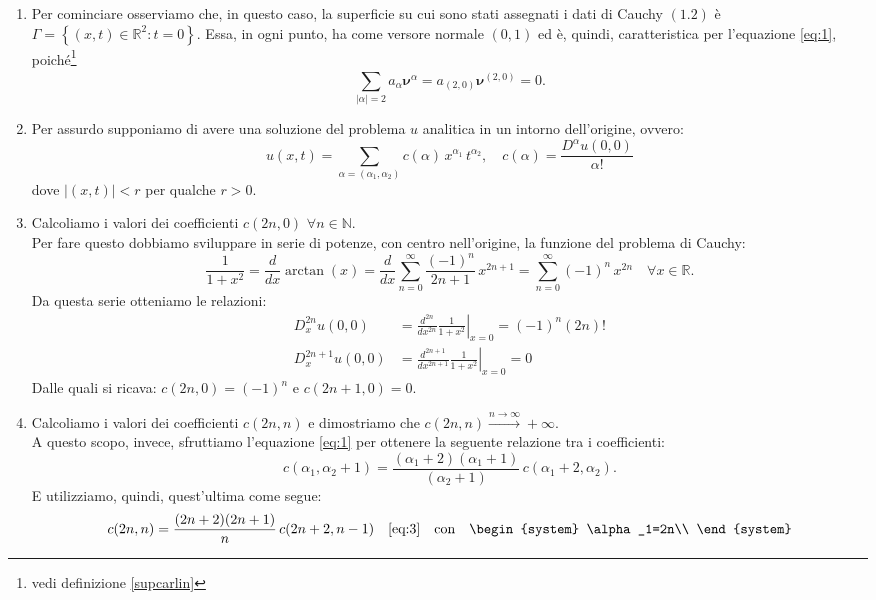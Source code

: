 \begin{enumerate}
\item
Per cominciare osserviamo che, in questo caso, la superficie su cui sono stati assegnati i dati di Cauchy $(1.2)$ è 
$\Gamma=\left\lbrace(x,t) \in \mathbb{R}^2:t=0\right\rbrace$. Essa, in ogni punto, ha come versore normale $(0,1)$ ed è, quindi,
caratteristica per l'equazione \eqref{eq:1}, poiché\footnote{vedi definizione \ref{supcarlin}}
$$\sum_{|\alpha|=2}^{\;} a_\alpha \boldsymbol{\nu}^\alpha = a_{(2,0)}\boldsymbol{\nu}^{(2,0)} = 0. $$
\item
Per assurdo supponiamo di avere una soluzione del problema $u$ analitica in un intorno dell'origine, ovvero:
$$u(x,t) = \sum_{\alpha = (\alpha_1, \alpha_2) }^{\;} c(\alpha) \, x^{\alpha_1} \, t ^{\alpha_2}, \quad
 c(\alpha) = \frac{D^\alpha u(0,0)}{\alpha!}$$
dove $|(x,t)|<r$ per qualche $r>0$.
\item
Calcoliamo i valori dei coefficienti $c(2n,0)$ $\forall n \in \mathbb{N}$.\\
Per fare questo dobbiamo sviluppare in serie di potenze, con centro nell'origine, la funzione del problema di Cauchy:
$$\frac{1}{1+x^2} = \frac{d}{dx}\arctan(x) = \frac{d}{dx}\sum_{n=0}^{\infty}\frac{(-1)^n}{2n+1} \, x^{2n+1} 
= \sum_{n=0}^{\infty}(-1)^n \, x^{2n} \quad \forall x \in \mathbb{R}.$$
Da questa serie otteniamo le relazioni:
\begin{align*}
D_x^{2n}u(0,0) &= \frac{d^{2n}}{dx^{2n}} \left. \frac{1}{1+x^2}\right|_{x=0} = (-1)^n (2n)!\\
D_x^{2n+1}u(0,0) &= \frac{d^{2n+1}}{dx^{2n+1}} \left. \frac{1}{1+x^2} \right|_{x=0} = 0
\end{align*} 
Dalle quali si ricava: $c(2n,0)=(-1)^n$ e $c(2n+1,0)=0$.
\item
Calcoliamo i valori dei coefficienti $c(2n,n)$ e dimostriamo che  $c(2n,n) \xrightarrow{n\rightarrow\infty} +\infty$.\\
A questo scopo, invece, sfruttiamo l'equazione \eqref{eq:1} per ottenere la seguente relazione tra i coefficienti:
\begin{equation} 
\label{eq:3}
c(\alpha_1,\alpha_2+1) = \frac{(\alpha_1+2)(\alpha_1+1)}{(\alpha_2+1)} \, c(\alpha_1+2,\alpha_2).
\end{equation}
E utilizziamo, quindi, quest'ultima come segue:
\begin{align*}
c(2n,n) &= \frac{(2n+2)(2n+1)}{n} \, c(2n+2,n-1)   &\eqref{eq:3}\quad\text{con} \quad 
\begin{system}
\alpha_1=2n\\

\end{system}
\end{align*}
\end{enumerate}
